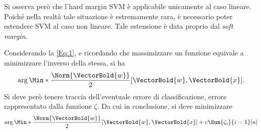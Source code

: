\documentclass{subfiles}
\begin{document}
Si osserva però che l'hard margin SVM è applicabile unicamente al caso lineare.
Poiché nella realtà tale situazione è estremamente rara, è necessario poter estendere SVM al caso non lineare.
Tale estensione è data proprio dal \emph{soft margin}.

Considerando la \eqref{Eq:1}, e ricordando che massimizzare un funzione equivale a minimizzare l'inverso della stessa, si ha
\[
    \arg\Min*{\frac{\Norm{\VectorBold{w}}}{2}}[\VectorBold{w}, \VectorBold{x}].
\]
Si deve però tenere traccia dell'eventuale errore di classificazione, errore rappresentato dalla funzione \(\zeta\).
Da cui in conclusione, si deve minimizzare
\[
    \arg\Min*{\frac{\Norm{\VectorBold{w}}}{2}}[\VectorBold{w}, \VectorBold{x}] + c \Sum{\zeta_{i}}{i = 1}[n]
\]
\end{document}
